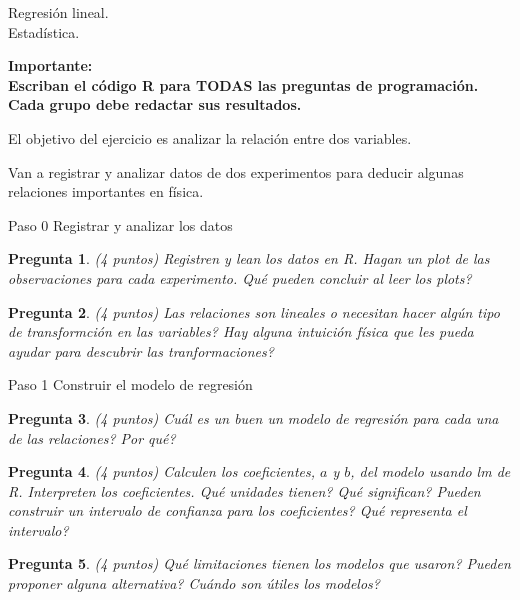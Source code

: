 \documentclass{article}
\newtheorem{pregunta}{Pregunta}
\def\die#1{{\domino#1}}
\newcommand{\skull}{\text{\usefont{U}{skulls}{m}{n}\symbol{'101}}}
\begin{document}
\begin{center}
  \Large Regresión lineal. \\
  \null
  Estadística.
\end{center}
\vspace{1cm}

\textbf{Importante:\\
 Escriban el código R para TODAS las preguntas de programación. \\ Cada grupo debe redactar sus resultados.}

\null\hfill

 El objetivo del ejercicio es analizar la relación entre dos variables.
\par
Van a registrar y analizar datos de dos experimentos para deducir algunas relaciones importantes en física.
 \begin{topbot}
   \vspace{0.7em}
   Paso 0 \quad Registrar y analizar los datos
   \vspace{0.7em}
 \end{topbot}

\begin{pregunta} (4 puntos)
Registren y lean los datos en R. Hagan un plot de las observaciones para cada experimento. Qué pueden concluir al leer los plots?
\end{pregunta}

\begin{pregunta} (4 puntos)
Las relaciones son lineales o necesitan hacer algún tipo de transformción en las variables? Hay alguna intuición física que les pueda ayudar para descubrir las tranformaciones?
\end{pregunta}

\begin{topbot}
  \vspace{0.7em}
  Paso 1 \quad Construir el modelo de regresión
  \vspace{0.7em}
\end{topbot}

\begin{pregunta} (4 puntos)
Cuál es un buen un modelo de regresión para cada una de las relaciones? Por qué?
\end{pregunta}

\begin{pregunta} (4 puntos)
Calculen los coeficientes, $a$ y $b$, del modelo usando lm de R. Interpreten los coeficientes. Qué unidades tienen? Qué significan? Pueden construir un intervalo de confianza para los coeficientes? Qué representa el intervalo?
\end{pregunta}

\begin{pregunta} (4 puntos)
Qué limitaciones tienen los modelos que usaron? Pueden proponer alguna alternativa? Cuándo son útiles los modelos?
\end{pregunta}
\end{document}
